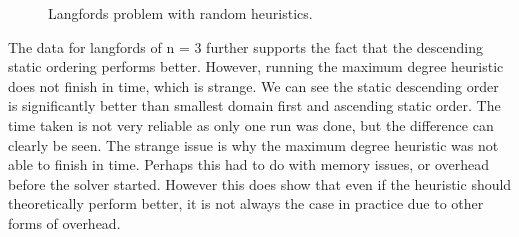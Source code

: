 \documentclass{article}
\begin{document}
\begin{figure}[H]
\centering
\begin{minipage}{0.45\textwidth}
\end{minipage}
%
\begin{minipage}{0.45\textwidth}
\end{minipage}
\caption{Langfords problem with random heuristics.}
\end{figure}
\noindent
The data for langfords of n = 3 further supports the fact that the descending static ordering performs better. However, running the maximum degree heuristic does not finish in time, which is strange. We can see the static descending order is significantly better than smallest domain first and ascending static order. The time taken is not very reliable as only one run was done, but the difference can clearly be seen. The strange issue is why the maximum degree heuristic was not able to finish in time. Perhaps this had to do with memory issues, or overhead before the solver started. However this does show that even if the heuristic should theoretically perform better, it is not always the case in practice due to other forms of overhead. 
\end{document}
